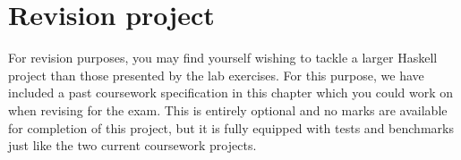 \cleardoublepage
\chapter{Revision project}

For revision purposes, you may find yourself wishing to tackle a larger Haskell project than those presented by the lab exercises. For this purpose, we have included a past coursework specification in this chapter which you could work on when revising for the exam. This is entirely optional and no marks are available for completion of this project, but it is fully equipped with tests and benchmarks just like the two current coursework projects.



